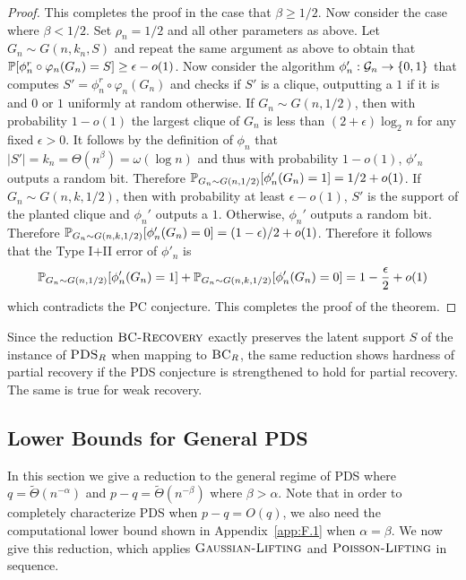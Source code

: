 \begin{proof}
This completes the proof in the case that $\beta \ge 1/2$. Now consider the case where $\beta < 1/2$. Set $\rho_n = 1/2$ and all other parameters as above. Let $G_n \sim G(n, k_n, S)$ and repeat the same argument as above to obtain that $\mathbb{P}[\phi_n^r \circ \varphi_n(G_n) = S] \ge \epsilon - o(1)$. Now consider the algorithm $\phi'_n : \mathcal{G}_n \to \{0, 1\}$ that computes $S' = \phi_n^r \circ \varphi_n(G_n)$ and checks if $S'$ is a clique, outputting a $1$ if it is and $0$ or $1$ uniformly at random otherwise. If $G_n \sim G(n, 1/2)$, then with probability $1 - o(1)$ the largest clique of $G_n$ is less than $(2 + \epsilon) \log_2 n$ for any fixed $\epsilon > 0$. It follows by the definition of $\phi_n$ that $|S'| = k_n = \Theta(n^{\beta}) = \omega(\log n)$ and thus with probability $1 - o(1)$, $\phi'_n$ outputs a random bit. Therefore $\mathbb{P}_{G_n \sim G(n, 1/2)}[\phi'_n(G_n) = 1] = 1/2 + o(1)$. If $G_n \sim G(n, k, 1/2)$, then with probability at least $\epsilon - o(1)$, $S'$ is the support of the planted clique and $\phi_n'$ outputs a $1$. Otherwise, $\phi_n'$ outputs a random bit. Therefore $\mathbb{P}_{G_n \sim G(n, k, 1/2)}[\phi'_n(G_n) = 0] = (1 - \epsilon)/2 + o(1)$. Therefore it follows that the Type I$+$II error of $\phi'_n$ is
$$\mathbb{P}_{G_n \sim G(n, 1/2)}[\phi'_n(G_n) = 1] + \mathbb{P}_{G_n \sim G(n, k, 1/2)}[\phi'_n(G_n) = 0] = 1 - \frac{\epsilon}{2} + o(1)$$
which contradicts the PC conjecture. This completes the proof of the theorem.
\end{proof}

Since the reduction $\textsc{BC-Recovery}$ exactly preserves the latent support $S$ of the instance of $\textsc{PDS}_R$ when mapping to $\textsc{BC}_R$, the same reduction shows hardness of partial recovery if the PDS conjecture is strengthened to hold for partial recovery. The same is true for weak recovery.

\subsection{Lower Bounds for General PDS}

In this section we give a reduction to the general regime of PDS where $q = \tilde{\Theta}(n^{-\alpha})$ and $p - q = \tilde{\Theta}(n^{-\beta})$ where $\beta > \alpha$. Note that in order to completely characterize PDS when $p - q = O(q)$, we also need the computational lower bound shown in Appendix~\ref{app:F.1} when $\alpha = \beta$. We now give this reduction, which applies $\textsc{Gaussian-Lifting}$ and $\textsc{Poisson-Lifting}$ in sequence.

